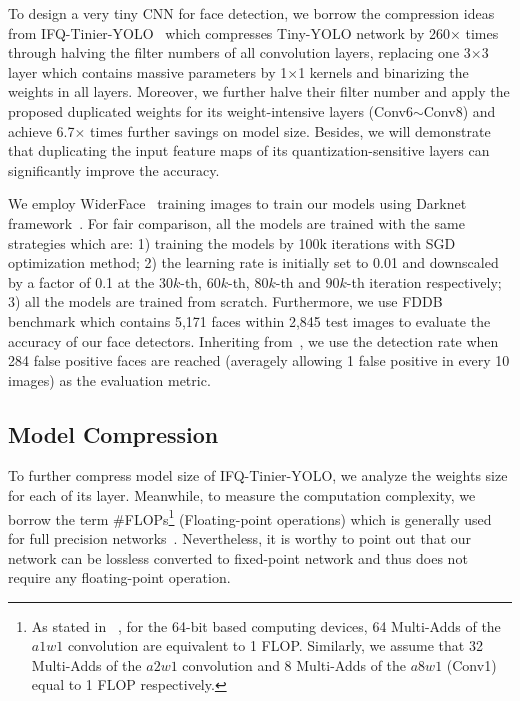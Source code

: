 \documentclass[10pt,twocolumn,letterpaper]{article}
\begin{document}
To design a very tiny CNN for face detection, we borrow the compression ideas from IFQ-Tinier-YOLO~\cite{IFQNet} which compresses Tiny-YOLO network by 260$\times$ times through halving the filter numbers of all convolution layers, replacing one 3$\times$3 layer which contains massive parameters by 1$\times$1 kernels and binarizing the weights in all layers. Moreover, we further halve their filter number and apply the proposed duplicated weights for its weight-intensive layers (Conv6$\sim$Conv8) and achieve 6.7$\times$ times further savings on model size. Besides, we will demonstrate that duplicating the input feature maps of its quantization-sensitive layers can significantly improve the accuracy.

We employ WiderFace~\cite{widerface} training images to train our models using Darknet framework~\cite{darknet}. For fair comparison, all the models are trained with the same strategies which are: 1) training the models by 100k iterations with SGD optimization method; 2) the learning rate is initially set to 0.01 and downscaled by a factor of 0.1 at the $30k$-th, $60k$-th, $80k$-th and $90k$-th iteration respectively; 3) all the models are trained from scratch. Furthermore, we use FDDB~\cite{FDDB} benchmark which contains 5,171 faces within 2,845 test images to evaluate the accuracy of our face detectors. Inheriting from~\cite{IFQNet}, we use the detection rate when 284 false positive faces are reached (averagely allowing 1 false positive in every 10 images) as the evaluation metric.


\subsection{Model Compression} \label{subsec:exp-Wdup}

To further compress model size of IFQ-Tinier-YOLO, we analyze the weights size for each of its layer. Meanwhile, to measure the computation complexity, we borrow the term \#FLOPs\footnote{As stated in ~\cite{XNOR}, for the 64-bit based computing devices, 64 Multi-Adds of the $a1w1$ convolution are equivalent to 1 FLOP. Similarly, we assume that 32 Multi-Adds of the $a2w1$ convolution and 8 Multi-Adds of the $a8w1$ (Conv1) equal to 1 FLOP respectively.} (Floating-point operations) which is generally used for full precision networks~\cite{FLOPs}. Nevertheless, it is worthy to point out that our network can be lossless converted to fixed-point network and thus does not require any floating-point operation.
\end{document}
